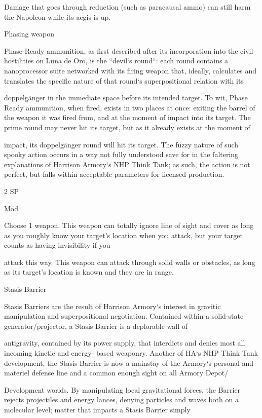  Damage that goes through reduction (such as paracausal ammo) can still harm the Napoleon while its
 aegis is up.

Phasing weapon

Phase-Ready ammunition, as first described after its incorporation into the civil hostilities on Luna de Oro,
is the “devil‘s round“: each round contains a nanoprocessor suite networked with its firing weapon that,
ideally, calculates and translates the specific nature of that round‘s superpositional relation with its

doppelgänger in the immediate space before its intended target. To wit, Phase Ready ammunition, when
fired, exists in two places at once: exiting the barrel of the weapon it was fired from, and at the moment of
impact into its target. The prime round may never hit its target, but as it already exists at the moment of

impact, its doppelgänger round will hit its target. The fuzzy nature of such spooky action occurs in a way
not fully understood save for in the faltering explanations of Harrison Armory‘s NHP Think Tank; as such,
the action is not perfect, but falls within acceptable parameters for licensed production.

2 SP

Mod

Choose 1 weapon. This weapon can totally ignore line of sight and cover as long as you roughly
know your target’s location when you attack, but your target counts as having invisibility if you




attack this way. This weapon can attack through solid walls or obstacles, as long as its target’s
location is known and they are in range.


Stasis Barrier

Stasis Barriers are the result of Harrison Armory‘s interest in gravitic manipulation and superpositional
negotiation. Contained within a solid-state generator/projector, a Stasis Barrier is a deplorable wall of

antigravity, contained by its power supply, that interdicts and denies most all incoming kinetic and energy-
based weaponry. Another of HA‘s NHP Think Tank development, the Stasis Barrier is now a mainstay of the
Armory‘s personal and materiel defense line and a common enough sight on all Armory Depot/

Development worlds. By manipulating local gravitational forces, the Barrier rejects projectiles and energy
lances, denying particles and waves both on a molecular level; matter that impacts a Stasis Barrier simply

